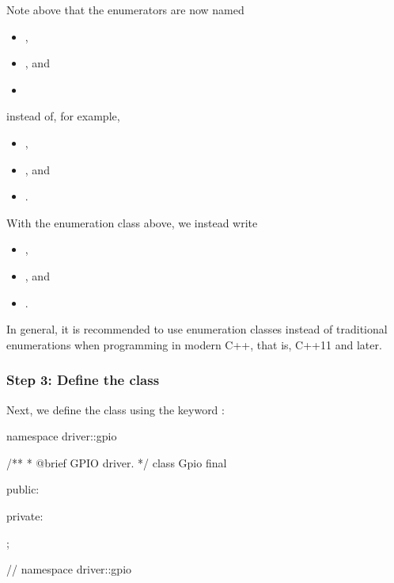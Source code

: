 Note above that the enumerators are now named
\begin{itemize}
  \item {},
  \item {}, and
  \item {}
\end{itemize}
instead of, for example,
\begin{itemize}
  \item {},
  \item {}, and
  \item {}.
\end{itemize}
With the enumeration class above, we instead write
\begin{itemize}
  \item {},
  \item {}, and
  \item {}.
\end{itemize}

In general, it is recommended to use enumeration classes instead of traditional enumerations when
programming in modern C++, that is, C++11 and later.

\subsubsection{Step 3: Define the class }
Next, we define the class  using the keyword :

\begin{cppcode}
namespace driver::gpio
{
/**
 * @brief GPIO driver.
 */
class Gpio final
{
public:

private:
};
} // namespace driver::gpio
\end{cppcode}


